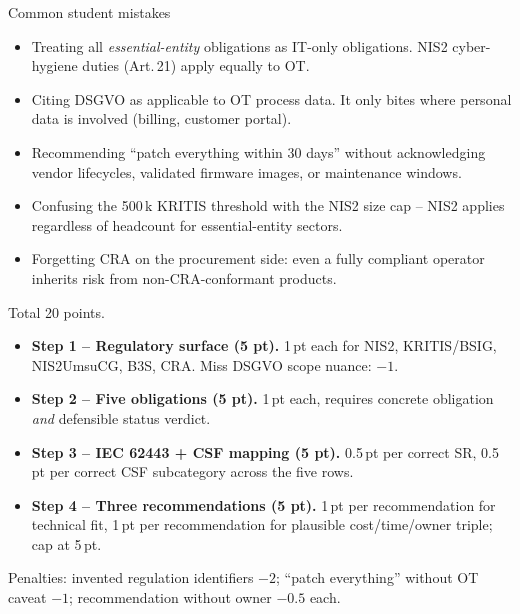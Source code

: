 \documentclass[11pt,a4paper]{article}
\begin{document}
\begin{solutionbox}{Common student mistakes}
\begin{itemize}\setlength{\itemsep}{1pt}
  \item Treating all \emph{essential-entity} obligations as IT-only obligations. NIS2 cyber-hygiene duties (Art.\,21) apply equally to OT.
  \item Citing DSGVO as applicable to OT process data. It only bites where personal data is involved (billing, customer portal).
  \item Recommending ``patch everything within 30 days'' without acknowledging vendor lifecycles, validated firmware images, or maintenance windows.
  \item Confusing the 500\,k KRITIS threshold with the NIS2 size cap -- NIS2 applies regardless of headcount for essential-entity sectors.
  \item Forgetting CRA on the procurement side: even a fully compliant operator inherits risk from non-CRA-conformant products.
\end{itemize}
\end{solutionbox}

\begin{rubricbox}
Total 20 points.
\begin{itemize}\setlength{\itemsep}{1pt}
  \item \textbf{Step 1 -- Regulatory surface (5 pt).} 1\,pt each for NIS2, KRITIS/BSIG, NIS2UmsuCG, B3S, CRA. Miss DSGVO scope nuance: $-1$.
  \item \textbf{Step 2 -- Five obligations (5 pt).} 1\,pt each, requires concrete obligation \emph{and} defensible status verdict.
  \item \textbf{Step 3 -- IEC 62443 + CSF mapping (5 pt).} 0.5\,pt per correct SR, 0.5\,pt per correct CSF subcategory across the five rows.
  \item \textbf{Step 4 -- Three recommendations (5 pt).} 1\,pt per recommendation for technical fit, 1\,pt per recommendation for plausible cost/time/owner triple; cap at 5\,pt.
\end{itemize}
Penalties: invented regulation identifiers $-2$; ``patch everything'' without OT caveat $-1$; recommendation without owner $-0.5$ each.
\end{rubricbox}
\end{document}
